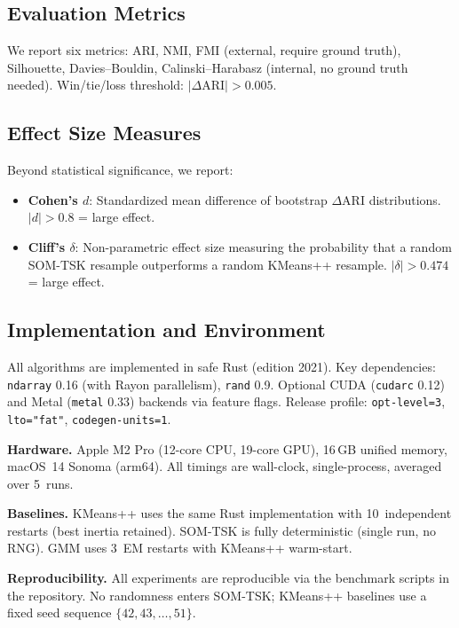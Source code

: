 \documentclass[journal]{IEEEtran}
\begin{document}
\subsection{Evaluation Metrics}

We report six metrics: ARI, NMI, FMI (external, require ground truth), Silhouette, Davies--Bouldin, Calinski--Harabasz (internal, no ground truth needed). Win/tie/loss threshold: $|\Delta\mathrm{ARI}| > 0.005$.

\subsection{Effect Size Measures}

Beyond statistical significance, we report:
\begin{itemize}
  \item \textbf{Cohen's $d$}: Standardized mean difference of bootstrap $\Delta$ARI distributions. $|d| > 0.8$ = large effect.
  \item \textbf{Cliff's $\delta$}: Non-parametric effect size measuring the probability that a random SOM-TSK resample outperforms a random KMeans++ resample. $|\delta| > 0.474$ = large effect.
\end{itemize}

\subsection{Implementation and Environment}

All algorithms are implemented in safe Rust (edition 2021). Key dependencies: \texttt{ndarray} 0.16 (with Rayon parallelism), \texttt{rand} 0.9. Optional CUDA (\texttt{cudarc} 0.12) and Metal (\texttt{metal} 0.33) backends via feature flags. Release profile: \texttt{opt-level=3}, \texttt{lto="fat"}, \texttt{codegen-units=1}.

\textbf{Hardware.} Apple M2 Pro (12-core CPU, 19-core GPU), 16\,GB unified memory, macOS~14 Sonoma (arm64). All timings are wall-clock, single-process, averaged over 5~runs.

\textbf{Baselines.} KMeans++ uses the same Rust implementation with 10~independent restarts (best inertia retained). SOM-TSK is fully deterministic (single run, no RNG). GMM uses 3~EM restarts with KMeans++ warm-start.

\textbf{Reproducibility.} All experiments are reproducible via the benchmark scripts in the repository. No randomness enters SOM-TSK; KMeans++ baselines use a fixed seed sequence $\{42, 43, \ldots, 51\}$.
\end{document}
